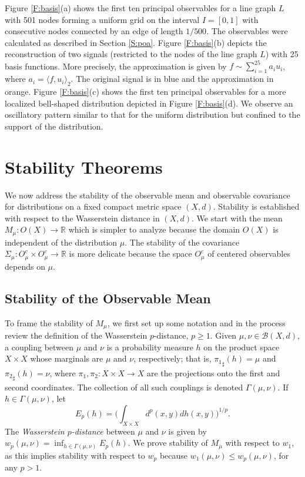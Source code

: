 \documentclass[11pt]{article}
\theoremstyle{definition}
\newcommand{\real}{\ensuremath{\mathbb{R}}}
\newcommand{\obs}[1]{\ensuremath{O(#1)}}
\newcommand{\cobs}[1]{\ensuremath{O^c_{#1}}}
\newcommand{\borel}{\ensuremath{\mathcal{B}}}
\begin{document}
Figure \ref{F:basis}(a) shows the first ten principal observables for a line graph $L$ with 501 nodes forming a uniform grid on the interval $I=[0,1]$ with consecutive nodes connected by an edge of length $1/500$. The observables were calculated as described in Section \ref{S:poa}. Figure \ref{F:basis}(b) depicts the reconstruction of two signals (restricted to the nodes of the line graph $L$) with 25 basis functions. More precisely, the approximation is given by $f \sim \sum_{i=1}^{25}  a_i  u_i$, where $a_i=\langle f,u_i\rangle_2$. The original signal is in blue and the approximation in orange. Figure \ref{F:basis}(c) shows the first ten principal observables for a more localized bell-shaped distribution depicted in Figure \ref{F:basis}(d). We observe an oscillatory pattern similar to that for the uniform distribution but confined to the support of the distribution.


\section{Stability Theorems} \label{S:proof}

We now address the stability of the observable mean and observable covariance for distributions on a fixed compact metric space $(X,d)$. Stability is established with respect to the Wasserstein distance in $(X,d)$. We start with the mean $M_\mu \colon \obs{X} \to \real$ which is simpler to analyze because the domain $\obs{X}$ is independent of the distribution $\mu$. The stability of the covariance $\Sigma_\mu \colon \cobs{\mu} \times \cobs{\mu} \to \real$ is more delicate because the space $\cobs{\mu}$ of centered observables depends on $\mu$.

\subsection{Stability of the Observable Mean} \label{S:stabmean}

To frame the stability of $M_\mu$, we first set up some notation and in the process review the definition of the Wasserstein $p$-distance, $p\geq 1$. Given $\mu, \nu \in \borel(X,d)$, a coupling between $\mu$ and $\nu$ is a probability measure $h$ on the product space $X \times X$ whose marginals are $\mu$ and $\nu$, respectively; that is, ${\pi_1}_\sharp (h)=\mu$ and ${\pi_2}_\sharp (h)=\nu$, where $\pi_1,\pi_2 \colon X \times X \to X$ are the projections onto the first and second coordinates. The collection of all such couplings is denoted $\Gamma(\mu,\nu)$. If $h \in \Gamma(\mu,\nu)$, let
\begin{equation} \label{E:pcost}
E_p (h) = \Big(\int_{X \times X} d^p(x,y) dh(x,y)\Big)^{1/p}.
\end{equation}
The {\em Wasserstein $p$-distance} between $\mu$ and $\nu$ is given by $w_p(\mu,\nu) = \inf_{h \in \Gamma(\mu,\nu)} E_p (h)$. We prove stability of $M_\mu$ with respect to $w_1$, as this implies stability with respect to $w_p$ because $w_1 (\mu,\nu) \leq w_p (\mu,\nu)$, for any $p >1$.
\end{document}
